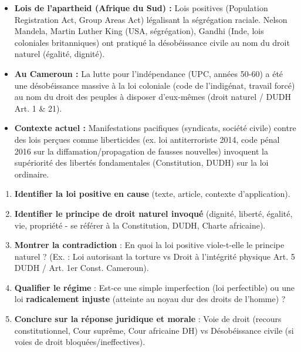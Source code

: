 \documentclass[11pt]{article}
\begin{document}
\begin{exemplebox}
\begin{itemize}
    \item \textbf{Lois de l'apartheid (Afrique du Sud) :} Lois positives (Population Registration Act, Group Areas Act) légalisant la ségrégation raciale. Nelson Mandela, Martin Luther King (USA, ségrégation), Gandhi (Inde, lois coloniales britanniques) ont pratiqué la désobéissance civile au nom du droit naturel (égalité, dignité).
    \item \textbf{Au Cameroun :} La lutte pour l'indépendance (UPC, années 50-60) a été une désobéissance massive à la loi coloniale (code de l'indigénat, travail forcé) au nom du droit des peuples à disposer d'eux-mêmes (droit naturel / DUDH Art. 1 \& 21).
    \item \textbf{Contexte actuel :} Manifestations pacifiques (syndicats, société civile) contre des lois perçues comme liberticides (ex. loi antiterroriste 2014, code pénal 2016 sur la diffamation/propagation de fausses nouvelles) invoquent la supériorité des libertés fondamentales (Constitution, DUDH) sur la loi ordinaire.
\end{itemize}
\end{exemplebox}

\begin{methode}
\begin{enumerate}
    \item \textbf{Identifier la loi positive en cause} (texte, article, contexte d'application).
    \item \textbf{Identifier le principe de droit naturel invoqué} (dignité, liberté, égalité, vie, propriété - se référer à la Constitution, DUDH, Charte africaine).
    \item \textbf{Montrer la contradiction} : En quoi la loi positive viole-t-elle le principe naturel ? (Ex. : Loi autorisant la torture vs Droit à l'intégrité physique Art. 5 DUDH / Art. 1er Const. Cameroun).
    \item \textbf{Qualifier le régime} : Est-ce une simple imperfection (loi perfectible) ou une loi \textbf{radicalement injuste} (atteinte au noyau dur des droits de l'homme) ?
    \item \textbf{Conclure sur la réponse juridique et morale} : Voie de droit (recours constitutionnel, Cour suprême, Cour africaine DH) vs Désobéissance civile (si voies de droit bloquées/ineffectives).
\end{enumerate}
\end{methode}
\end{document}
